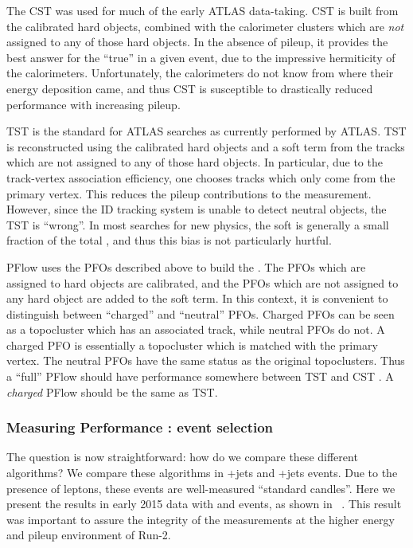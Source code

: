 The CST \met was used for much of the early ATLAS data-taking.
CST \met is built from the calibrated hard objects, combined with the calorimeter clusters which are \textit{not} assigned to any of those hard objects.
In the absence of pileup, it provides the best answer for the ``true'' \met in a given event, due to the impressive hermiticity of the calorimeters.
Unfortunately, the calorimeters do not know from where their energy deposition came, and thus CST is susceptible to drastically reduced performance with increasing pileup.

TST \met is the standard for ATLAS searches as currently performed by ATLAS.
TST \met is reconstructed using the calibrated hard objects and a soft term from the tracks which are not assigned to any of those hard objects.
In particular, due to the track-vertex association efficiency, one chooses tracks which only come from the primary vertex.
This reduces the pileup contributions to the \met measurement.
However, since the ID tracking system is unable to detect neutral objects, the TST \met is ``wrong''.
In most searches for new physics, the soft \met is generally a small fraction of the total \met, and thus this bias is not particularly hurtful.

PFlow \met uses the PFOs described above to build the \met.
The PFOs which are assigned to hard objects are calibrated, and the PFOs which are not assigned to any hard object are added to the soft term.
In this context, it is convenient to distinguish between ``charged'' and ``neutral'' PFOs.
Charged PFOs can be seen as a topocluster which has an associated track, while neutral PFOs do not.
A charged PFO is essentially a topocluster which is matched with the primary vertex.
The neutral PFOs have the same status as the original topoclusters.
Thus a ``full'' PFlow \met should have performance somewhere between TST \met and CST \met\footnotemark.
A \textit{charged} PFlow \met should be the same as TST.


\subsubsection{Measuring \met Performance : event selection}
\label{subsubsec:met_event_selection}
The question is now straightforward: how do we compare these different algorithms?
We compare these algorithms in \Zll+jets and \Wln+jets events.
Due to the presence of leptons, these events are well-measured ``standard candles''.
Here we present the results in early 2015 data with \Zmm and \Wen events, as shown in ~\cite{ATL-PHYS-PUB-2015-023,ATL-PHYS-PUB-2015-027}.
This result was important to assure the integrity of the \met measurements at the higher energy and pileup environment of Run-2.

